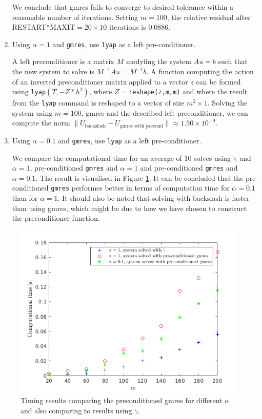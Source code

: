 \begin{enumerate}
We conclude that gmres fails to converge to desired tolerance within a reasonable number of iterations. Setting $m=100$, the relative residual after RESTART*MAXIT$=20\times 10$ iterations is 0.0886.
\item Using $\alpha = 1$ and \texttt{gmres}, use \texttt{lyap} as a left pre-conditioner.

A left preconditioner is a matrix $M$ modyfing  the system $Au = b$ such that the new system to solve is $M^{-1}Au = M^{-1}b$. A function computing the action of an inverted preconditioner matrix applied to a vector $z$ can be formed using \texttt{lyap}$(T,-Z*h^2)$, where $Z=$\texttt{reshape(z,m,m)} and where the result from the \texttt{lyap} command is reshaped to a vector of size $m^2\times 1$. Solving the system using $m=100$, gmres and the described left-preconditioner, we can compute the norm $\|U_{\text{backslash}}-U_{\text{gmres with precond}}\| \approx 1.50\times 10^{-9}$.

\item Using $\alpha = 0.1$ and \texttt{gmres}, use \texttt{lyap} as a left pre-conditioner.

We compare the computational time for an average of 10 solves using $\backslash$ and $\alpha = 1$, pre-conditioned \texttt{gmres} and $\alpha=1$ and pre-conditioned \texttt{gmres} and $\alpha = 0.1$. The result is visualised in Figure \ref{time12_2}. It can be concluded that the pre-conditioned \texttt{gmres} performes better in terms of computation time for $\alpha = 0.1$ than for $\alpha = 1$. It should also be noted that solving with backslash is faster than using gmres, which might be due to how we have chosen to construct the preconditioner-function.
\end{enumerate}
\begin{figure}[h!]
\centering
\includegraphics[scale=0.6]{time_gmres.png}
\caption{Timing results comparing the preconditioned gmres for different $\alpha$ and also comparing to results using $\backslash$.}
\label{time12_2}
\end{figure}

